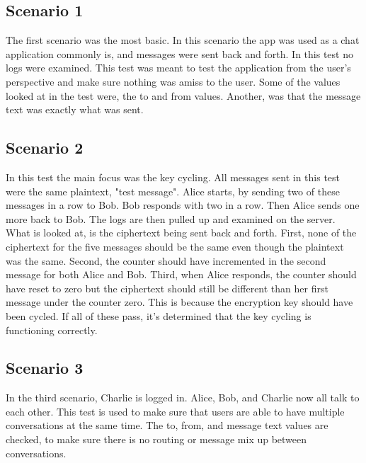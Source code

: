\subsection{Scenario 1}


The first scenario was the most basic. In this scenario the app was used as a chat application commonly is, and messages were sent back and forth. In this test no logs were examined. This test was meant to test the application from the user's perspective and make sure nothing was amiss to the user. Some of the values looked at in the test were, the to and from values. Another, was that the message text was exactly what was sent.


\subsection{Scenario 2}


In this test the main focus was the key cycling. All messages sent in this test were the same plaintext, "test message". Alice starts, by sending two of these messages in a row to Bob. Bob responds with two in a row. Then Alice sends one more back to Bob. The logs are then pulled up and examined on the server. What is looked at, is the ciphertext being sent back and forth. First, none of the ciphertext for the five messages should be the same even though the plaintext was the same. Second, the counter should have incremented in the second message for both Alice and Bob. Third, when Alice responds, the counter should have reset to zero but the ciphertext should still be different than her first message under the counter zero. This is because the encryption key should have been cycled. If all of these pass, it's determined that the key cycling is functioning correctly.


\subsection{Scenario 3}


In the third scenario, Charlie is logged in. Alice, Bob, and Charlie now all talk to each other. This test is used to make sure that users are able to have multiple conversations at the same time. The to, from, and message text values are checked, to make sure there is no routing or message mix up between conversations.



